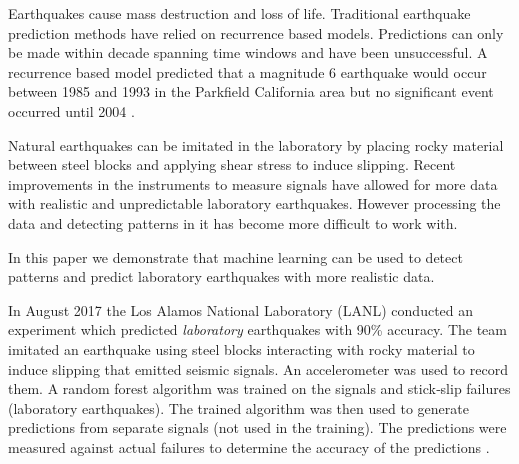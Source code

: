\documentclass[]{llncs}
\begin{document}
Earthquakes cause mass destruction and loss of life. Traditional earthquake prediction methods have relied on recurrence based models. Predictions can only be made within decade spanning time windows and have been unsuccessful. A recurrence based model predicted that a magnitude 6 earthquake would occur between 1985 and 1993 in the Parkfield California area but no significant event occurred until 2004 \cite{Jackson}.
 \par

Natural earthquakes can be imitated in the laboratory by placing rocky material between steel blocks and applying shear stress to induce slipping. Recent improvements in the instruments \cite{Bertrand} to measure signals have allowed for more data with realistic and unpredictable laboratory earthquakes. However processing the data and detecting patterns in it has become more difficult to work with. \par

In this paper we demonstrate that machine learning can be used to detect patterns and predict laboratory earthquakes with more realistic data. \par



In August 2017 the Los Alamos National Laboratory (LANL) conducted an experiment %
 which predicted \emph{laboratory} earthquakes with 90\% accuracy. The team imitated an earthquake using steel blocks interacting with rocky material to induce slipping that emitted seismic signals. An accelerometer was used to record them. A random forest algorithm was trained on the signals and stick‐slip failures (laboratory earthquakes). The trained algorithm was then used to generate predictions from separate signals (not used in the training). The predictions were measured against actual failures to determine the accuracy of the predictions \cite{LANLNews}.\par
\end{document}
